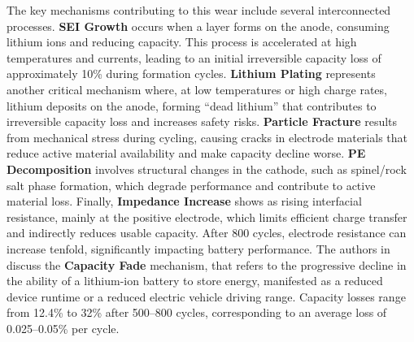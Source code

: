 The key mechanisms contributing to this wear include several interconnected processes. \textbf{SEI Growth} occurs when a layer forms on the anode, consuming lithium ions and reducing capacity. This process is accelerated at high temperatures and currents, leading to an initial irreversible capacity loss of approximately 10\% during formation cycles. \textbf{Lithium Plating} represents another critical mechanism where, at low temperatures or high charge rates, lithium deposits on the anode, forming ``dead lithium'' that contributes to irreversible capacity loss and increases safety risks. \textbf{Particle Fracture} results from mechanical stress during cycling, causing cracks in electrode materials that reduce active material availability and make capacity decline worse. \textbf{PE Decomposition} involves structural changes in the cathode, such as spinel/rock salt phase formation, which degrade performance and contribute to active material loss. Finally, \textbf{Impedance Increase} shows as rising interfacial resistance, mainly at the positive electrode, which limits efficient charge transfer and indirectly reduces usable capacity. After 800 cycles, electrode resistance can increase tenfold, significantly impacting battery performance. The authors in \cite{zhang_studies_2000} discuss the \textbf{Capacity Fade} mechanism, that refers to the progressive decline in the ability of a lithium-ion battery to store energy, manifested as a reduced device runtime or a reduced electric vehicle driving range. Capacity losses range from 12.4\% to 32\% after 500--800 cycles, corresponding to an average loss of 0.025--0.05\% per cycle.

